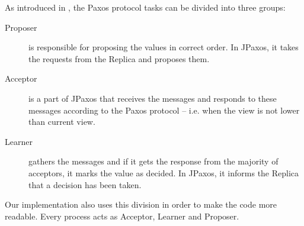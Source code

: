 As introduced in \cite{Lam01}, the Paxos protocol tasks can be divided into three groups:
\begin{description}
 \item[Proposer] is responsible for proposing the values in correct order. In JPaxos, it takes the requests from the Replica and proposes them.
 
 \item[Acceptor] is a part of JPaxos that receives the \propose messages and responds to these messages according to the Paxos protocol -- i.e. when the view is not lower than current view.
 
 \item[Learner] gathers the \accept messages and if it gets the response from the majority of acceptors, it marks the value as decided. In JPaxos, it informs the Replica that a decision has been taken.
\end{description}

Our implementation also uses this division in order to make the code more readable. Every process acts as Acceptor, Learner and Proposer.

